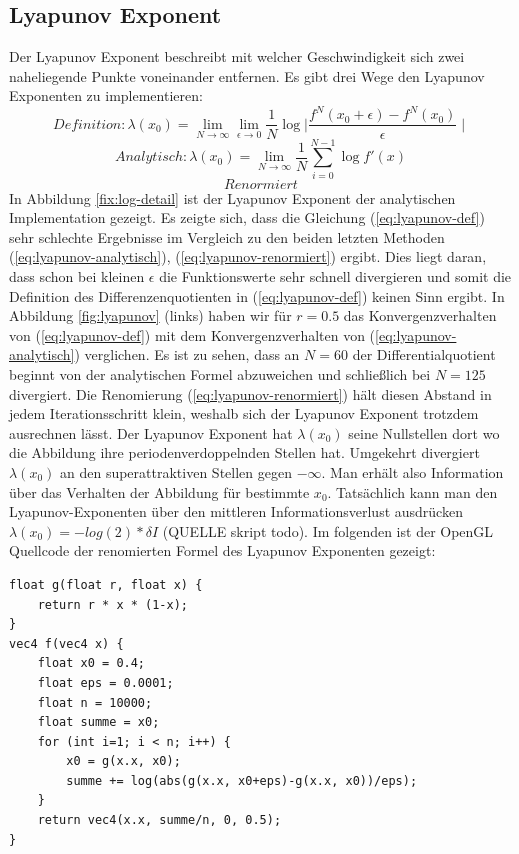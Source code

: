 \documentclass{scrartcl}
\begin{document}
\subsection{Lyapunov Exponent}
Der Lyapunov Exponent beschreibt mit welcher Geschwindigkeit sich zwei naheliegende Punkte voneinander entfernen. 
Es gibt drei Wege den Lyapunov Exponenten zu implementieren:
\begin{equation}
Definition: \lambda(x_0) = \lim_{N \rightarrow \infty}\lim_{\epsilon \rightarrow 0} \frac{1}{N}\log{\mid \frac{f^N(x_0+\epsilon)- f^N(x_0)}{\epsilon} \mid} 
\label{eq:lyapunov-def}
\end{equation}
\begin{equation}
Analytisch: \lambda(x_0) = \lim_{N \rightarrow \infty} \frac{1}{N} \sum_{i=0}^{N-1}  \log{f'(x)} 
\label{eq:lyapunov-analytisch}
\end{equation}
\begin{equation}
Renormiert
\label{eq:lyapunov-renormiert}
\end{equation}
In Abbildung \ref{fix:log-detail} ist der Lyapunov Exponent der analytischen Implementation gezeigt.
Es zeigte sich, dass die Gleichung (\ref{eq:lyapunov-def}) sehr schlechte Ergebnisse im Vergleich zu den beiden letzten Methoden (\ref{eq:lyapunov-analytisch}), (\ref{eq:lyapunov-renormiert}) ergibt.
Dies liegt daran, dass schon bei kleinen $\epsilon$ die Funktionswerte sehr schnell divergieren und somit die Definition des Differenzenquotienten in (\ref{eq:lyapunov-def}) keinen Sinn ergibt.
In Abbildung \ref{fig:lyapunov} (links) haben wir für $r=0.5$ das Konvergenzverhalten von (\ref{eq:lyapunov-def}) mit dem Konvergenzverhalten von (\ref{eq:lyapunov-analytisch}) verglichen. Es ist zu sehen, dass an $N=60$ der Differentialquotient beginnt von der analytischen Formel abzuweichen und schließlich bei $N=125$ divergiert.
Die Renomierung (\ref{eq:lyapunov-renormiert}) hält diesen Abstand in jedem Iterationsschritt klein, weshalb sich der Lyapunov Exponent trotzdem ausrechnen lässt.
Der Lyapunov Exponent hat $\lambda(x_0)$ seine Nullstellen dort wo die Abbildung ihre periodenverdoppelnden Stellen hat. Umgekehrt divergiert $\lambda(x_0)$ an den superattraktiven Stellen gegen $-\infty$.
Man erhält also Information über das Verhalten der Abbildung für bestimmte $x_0$.
Tatsächlich kann man den Lyapunov-Exponenten über den mittleren Informationsverlust ausdrücken $\lambda(x_0)=-log(2)*\delta I$ (QUELLE skript todo).
Im folgenden ist der OpenGL Quellcode der renomierten Formel des Lyapunov Exponenten gezeigt:
\begin{lstlisting}
float g(float r, float x) {
    return r * x * (1-x);
}
vec4 f(vec4 x) {
    float x0 = 0.4;
    float eps = 0.0001;
    float n = 10000;
    float summe = x0;
    for (int i=1; i < n; i++) {
        x0 = g(x.x, x0);
        summe += log(abs(g(x.x, x0+eps)-g(x.x, x0))/eps);
    }
    return vec4(x.x, summe/n, 0, 0.5);
}
\end{lstlisting}
\end{document}

